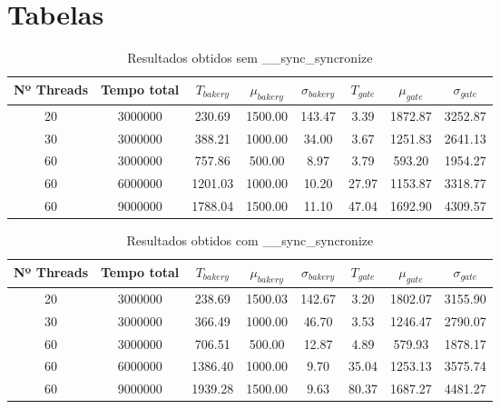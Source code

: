 \documentclass[12pt]{article}
\begin{document}
\section{Tabelas}

\begin{center}
	\begin{table}[h!]
      \begin{tabular}{|cc|ccc|ccc|}
          \hline
            Nº Threads & Tempo total & $T_{bakery}$ & $\mu_{bakery}$ & $\sigma_{bakery}$ & $T_{gate}$ & $\mu_{gate}$ & $\sigma_{gate}$ \\ \hline \hline
            20 & 3000000 & 230.69 & 1500.00 & 143.47 & 3.39 & 1872.87 & 3252.87 \\
            30 & 3000000 & 388.21 & 1000.00 & 34.00 & 3.67 & 1251.83 & 2641.13  \\ \hline
            60 & 3000000 & 757.86 & 500.00 & 8.97 & 3.79 & 593.20 & 1954.27  \\ \hline
            60 & 6000000 & 1201.03 & 1000.00 & 10.20 & 27.97 & 1153.87 & 3318.77  \\
            60 & 9000000 & 1788.04 & 1500.00 & 11.10 & 47.04 & 1692.90 & 4309.57  \\ \hline
    	\end{tabular}
        \caption{Resultados obtidos sem \_\_sync\_syncronize}
        \label{table:s-ss}
	\end{table}

	\begin{table}[h!]
    	\begin{tabular}{|cc|ccc|ccc|}
          \hline
            Nº Threads & Tempo total & $T_{bakery}$ & $\mu_{bakery}$ & $\sigma_{bakery}$ & $T_{gate}$ & $\mu_{gate}$ & $\sigma_{gate}$ \\ \hline \hline
            20 & 3000000 & 238.69 & 1500.03 & 142.67 & 3.20 & 1802.07 & 3155.90 \\
            30 & 3000000 & 366.49 & 1000.00 & 46.70 & 3.53 & 1246.47 & 2790.07  \\ \hline
            60 & 3000000 & 706.51 & 500.00 & 12.87 & 4.89 & 579.93 & 1878.17 \\ \hline
            60 & 6000000 & 1386.40 & 1000.00 & 9.70 & 35.04 & 1253.13 & 3575.74  \\
            60 & 9000000 & 1939.28 & 1500.00 & 9.63 & 80.37 & 1687.27 & 4481.27  \\ \hline
		\end{tabular}
        \caption{Resultados obtidos com \_\_sync\_syncronize}
        \label{table:c-ss}
	\end{table}
    

\end{center}
\end{document}
